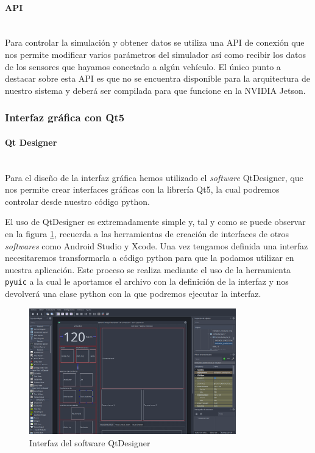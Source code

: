 \paragraph{API}\mbox{}\\
Para controlar la simulación y obtener datos se utiliza una API de conexión que nos permite modificar varios parámetros del simulador así como recibir los datos de los sensores que hayamos conectado a algún vehículo.
El único punto a destacar sobre esta API es que no se encuentra disponible para la arquitectura de nuestro sistema y deberá ser compilada para que funcione en la NVIDIA Jetson.



\clearpage
\subsubsection{Interfaz gráfica con Qt5}
\paragraph{Qt Designer}\mbox{}\\

Para el diseño de la interfaz gráfica hemos utilizado el \textit{software} QtDesigner, que nos permite crear interfaces gráficas con la librería Qt5, la cual podremos controlar desde nuestro código python.

El uso de QtDesigner es extremadamente simple y, tal y como se puede observar en la figura \ref{fig:qtdesigner}, recuerda a las herramientas de creación de interfaces de otros \textit{softwares} como Android Studio y Xcode.
Una vez tengamos definida una interfaz necesitaremos transformarla a código python para que la podamos utilizar en nuestra aplicación. Este proceso se realiza mediante el uso de la herramienta \texttt{pyuic} a la cual le aportamos el archivo con la definición de la interfaz y nos devolverá una clase python con la que podremos ejecutar la interfaz.

\begin{figure}[h!]
    \centering
    \includegraphics[width=0.8\textwidth]{img/qtdesigner.png}
    \caption{Interfaz del software QtDesigner}
    \label{fig:qtdesigner}
\end{figure}


